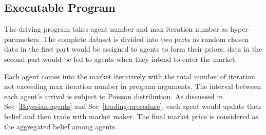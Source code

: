 \documentclass[12pt]{article}
\begin{document}


\subsection{Executable Program}\label{main-executable}
The driving program takes agent number and max iteration number as hyper-parameters. The complete dataset is divided into two parts as random chosen data in the first part would be assigned to agents to form their priors, data in the second part would be fed to agents when they intend to enter the market.

Each agent comes into the market iteratively with the total number of iteration not exceeding max iteration number in program arguments. The interval between each agent's arrival is subject to Poisson distribution.  %
As discussed in Sec~\ref{Bayesian-agents} and Sec~\ref{trading-precedure}, each agent would update their belief and then trade with market maker. The final market price is considered as the aggregated belief among agents.
\end{document}
